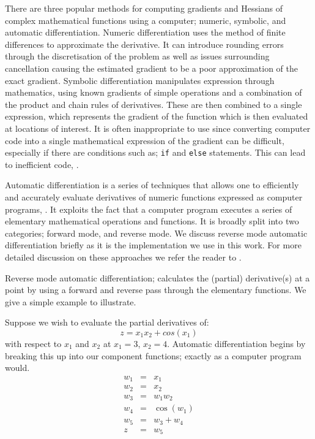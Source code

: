 There are three popular methods for computing gradients and Hessians of complex mathematical functions using a computer; numeric, symbolic, and automatic differentiation.
Numeric differentiation uses the method of finite differences to approximate the derivative.
It can introduce rounding errors through the discretisation of the problem as well as issues surrounding cancellation causing the estimated gradient to be a poor approximation of the exact gradient.
Symbolic differentiation manipulates expression through mathematics, using known gradients of simple operations and a combination of the product and chain rules of derivatives.
These are then combined to a single expression, which represents the gradient of the function which is then evaluated at locations of interest.
It is often inappropriate to use since converting computer code into a single mathematical expression of the gradient can be difficult, especially if there are conditions such as; \verb*|if| and \verb*|else| statements. 
This can lead to inefficient code, \citep{baydin_automatic_2018}.

Automatic differentiation is a series of techniques that allows one to efficiently and accurately evaluate derivatives of numeric functions expressed as computer programs, \citep{neidinger_introduction_2010}.
It exploits the fact that a computer program executes a series of elementary mathematical operations and functions.
It is broadly split into two categories; forward mode, and reverse mode.
We discuss reverse mode automatic differentiation briefly as it is the implementation we use in this work.
For more detailed discussion on these approaches we refer the reader to \citep{neidinger_introduction_2010}.

Reverse mode automatic differentiation; calculates the (partial) derivative(s) at a point by using a forward and reverse pass through the elementary functions.
We give a simple example to illustrate.

Suppose we wish to evaluate the partial derivatives of:
\begin{equation}
	z = x_1 x_2 + cos(x_1)
\end{equation}
with respect to $x_1$ and $x_2$ at $x_1=3$, $x_2=4$.
Automatic differentiation begins by breaking this up into our component functions; exactly as a computer program would. 
\begin{eqnarray*}
	w_1 &=& x_1 \\
	w_2 &=& x_2 \\
	w_3 &=& w_1 w_2 \\
	w_4 &=& \cos\left(w_1\right) \\
	w_5 &=& w_3 + w_4 \\
	z &=& w_5
\end{eqnarray*}

